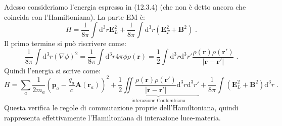 \documentclass[12pt,a4paper]{report}
\theoremstyle{definition}
\numberwithin{equation}{section}
\newcommand{\diff}[1][]{\mathrm{d}#1}
\begin{document}
Adesso consideriamo l'energia espressa in (12.3.4) (che non è detto ancora che coincida con l'Hamiltoniana). La parte EM è:
\begin{equation*}
H=\frac{1}{8\pi}\int\diff^3{r}\mathbf{E}_L^2+\frac{1}{8\pi}\int\diff^3{r}(\mathbf{E}_T^2+\mathbf{B}^2)\;.
\end{equation*}
Il primo termine si può riscrivere come:
\begin{equation}
\frac{1}{8\pi}\int\diff^3{r}(\nabla\phi)^2=\frac{1}{8\pi}\int\diff^3{r} 4\pi\phi\rho(\mathbf{r})=\frac{1}{2}\int\diff^3{r}\diff^3{r'}\frac{\rho(\mathbf{r})\rho(\mathbf{r}')}{|\mathbf{r}-\mathbf{r}'|}\;.
\end{equation}
Quindi l'energia si scrive come:
\begin{equation}
H=\sum_a \frac{1}{2m_a}\left(\mathbf{p}_a-\frac{q_a}{c}\mathbf{A}(\mathbf{r}_a)\right)^2+\underbrace{\frac{1}{2}\iint \frac{\rho(\mathbf{r})\rho(\mathbf{r}')}{|\mathbf{r}-\mathbf{r}'|}\diff^3{r}\diff^3{r'}}_{\mbox{interazione Coulombiana}}+\frac{1}{8\pi}\int (\mathbf{E}_L^2+\mathbf{B}^2)\diff^3{r}\;.
\end{equation}
Questa verifica le regole di commutazione proprie dell'Hamiltoniana, quindi rappresenta effettivamente l'Hamiltoniana di interazione luce-materia.
\end{document}
